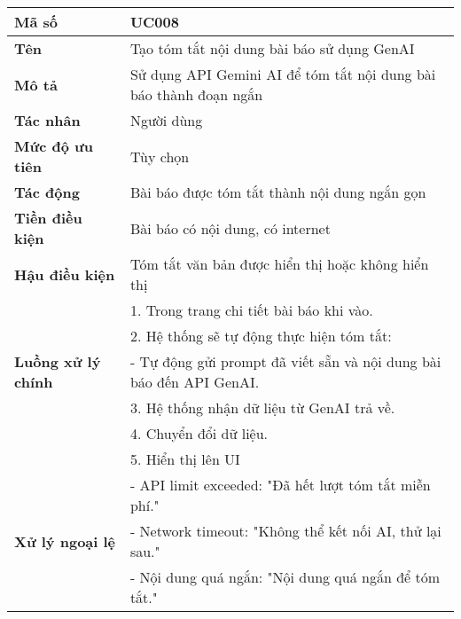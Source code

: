\begingroup
\renewcommand{\arraystretch}{1.1}
\small
\centering
\noindent
\begin{minipage}{\textwidth}
    \centering
    \begin{tabular}{|m{3cm}|m{9cm}|}
        \hline
        \textbf{Mã số}  & UC008 \\
        \hline
        \textbf{Tên}  & Tạo tóm tắt nội dung bài báo sử dụng GenAI \\
        \hline
        \textbf{Mô tả}  & Sử dụng API Gemini AI để tóm tắt nội dung bài báo thành đoạn ngắn \\
        \hline
        \textbf{Tác nhân}  & Người dùng \\
        \hline
        \textbf{Mức độ ưu tiên}  & Tùy chọn \\
        \hline
        \textbf{Tác động}  & Bài báo được tóm tắt thành nội dung ngắn gọn \\
        \hline
        \textbf{Tiền điều kiện}  & Bài báo có nội dung, có internet \\
        \hline
        \textbf{Hậu điều kiện}  & Tóm tắt văn bản được hiển thị hoặc không hiển thị \\
        \hline
        \multirow{5}{*}{\textbf{Luồng xử lý chính}}
            & 1. Trong trang chi tiết bài báo khi vào. \\
            & 2. Hệ thống sẽ tự động thực hiện tóm tắt: \\
            & - Tự động gửi prompt đã viết sẵn và nội dung bài báo đến API GenAI. \\
            & 3. Hệ thống nhận dữ liệu từ GenAI trả về. \\
            & 4. Chuyển đổi dữ liệu. \\
            & 5. Hiển thị lên UI \\
        \hline
        \multirow{3}{*}{\textbf{Xử lý ngoại lệ}}
            & - API limit exceeded: "Đã hết lượt tóm tắt miễn phí." \\
            & - Network timeout: "Không thể kết nối AI, thử lại sau." \\
            & - Nội dung quá ngắn: "Nội dung quá ngắn để tóm tắt." \\
        \hline
    \end{tabular}
\end{minipage}
\endgroup
